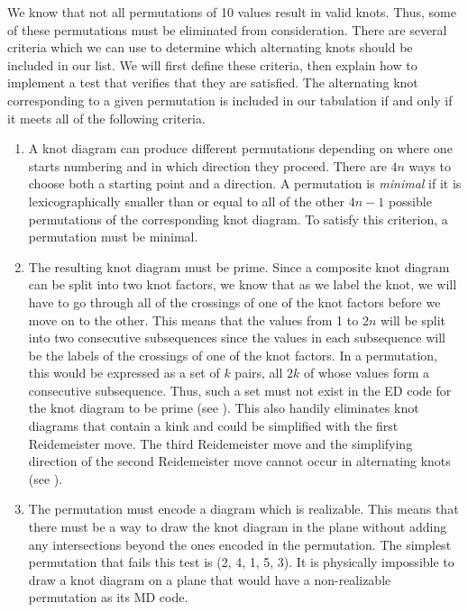 \begin{paper}
We know that not all permutations of 10 values result in valid knots.
Thus, some of these permutations must be eliminated from consideration.
There are several criteria which we can use to determine which alternating knots
should be included in our list.
We will first define these criteria, then explain how to implement a test that
verifies that they are satisfied.
The alternating knot corresponding to a given permutation is included in our
tabulation if and only if it meets all of the following criteria.

\begin{enumerate}
\item A knot diagram can produce different permutations depending on where one
starts numbering and in which direction they proceed.
There are $4n$ ways to choose both a starting point and a direction.
A permutation is \textit{minimal} if it is lexicographically smaller than or
equal to all of the other $4n-1$ possible permutations of the corresponding knot
diagram.
To satisfy this criterion, a permutation must be minimal.

\item The resulting knot diagram must be prime.
Since a composite knot diagram can be split into two knot factors, we know that
as we label the knot, we will have to go through all of the crossings of one of
the knot factors before we move on to the other.
This means that the values from 1 to $2n$ will be split into two consecutive
subsequences since the values in each subsequence will be the labels of the
crossings of one of the knot factors.
In a permutation, this would be expressed as a set of $k$ pairs, all $2k$ of
whose values form a consecutive subsequence.
Thus, such a set must not exist in the ED code for the knot diagram to be prime
(see \figComposite).
This also handily eliminates knot diagrams that contain a kink and could be
simplified with the first Reidemeister move.
The third Reidemeister move and the simplifying direction of the second
Reidemeister move cannot occur in alternating knots (see \figMoves).

\item The permutation must encode a diagram which is realizable.
This means that there must be a way to draw the knot diagram in the plane
without adding any intersections beyond the ones encoded in the permutation.
The simplest permutation that fails this test is (2, 4, 1, 5, 3).
It is physically impossible to draw a knot diagram on a plane that would have a
non-realizable permutation as its MD code.


\end{enumerate}
\end{paper}
